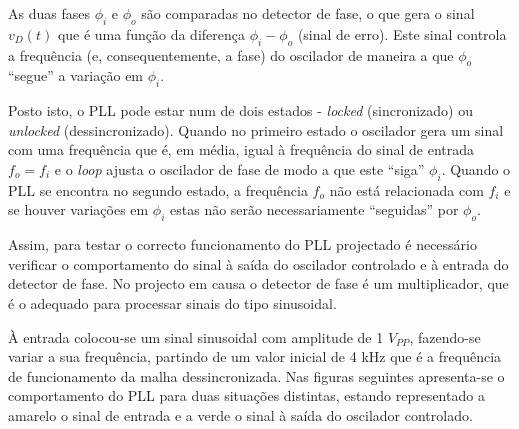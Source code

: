 \documentclass[11pt]{article}
\numberwithin{equation}{section}
\begin{document}
As duas fases $\phi_{i}$ e $\phi_{o}$ são comparadas no detector de fase, o que gera o sinal $v_{D}\left(t\right)$ que é uma função da diferença $\phi_{i} - \phi_{o}$ (sinal de erro). Este sinal controla a frequência (e, consequentemente, a fase) do oscilador de maneira a que $\phi_{o}$ ``segue'' a variação em $\phi_{i}$.

Posto isto, o PLL pode estar num de dois estados - \textit{locked} (sincronizado) ou \textit{unlocked} (dessincronizado). Quando no primeiro estado o oscilador gera um sinal com uma frequência que é, em média, igual à frequência do sinal de entrada $f_o = f_i$ e o \textit{loop} ajusta o oscilador de fase de modo a que este ``siga'' $\phi_{i}$. Quando o PLL se encontra no segundo estado, a frequência $f_o$ não está relacionada com $f_i$ e se houver variações em $\phi_{i}$ estas não serão necessariamente ``seguidas'' por $\phi_{o}$.

Assim, para testar o correcto funcionamento do PLL projectado é necessário verificar o comportamento do sinal à saída do oscilador controlado e à entrada do detector de fase. No projecto em causa o detector de fase é um multiplicador, que é o adequado para processar sinais do tipo sinusoidal. 

À entrada colocou-se um sinal sinusoidal com amplitude de 1 $V_{PP}$, fazendo-se variar a sua frequência, partindo de um valor inicial de 4 kHz que é a frequência de funcionamento da malha dessincronizada. Nas figuras seguintes apresenta-se o comportamento do PLL para duas situações distintas, estando representado a amarelo o sinal de entrada e a verde o sinal à saída do oscilador controlado.
\end{document}
